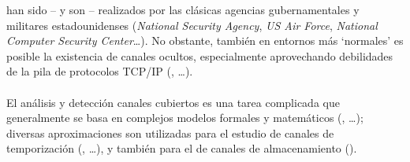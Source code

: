 han sido -- y son -- realizados por las cl\'asicas agencias gubernamentales 
y militares estadounidenses ({\it National Security Agency}, {\it US Air Force},
{\it National Computer Security Center}\ldots). No obstante, tambi\'en en
entornos m\'as `normales' es posible la existencia de canales ocultos, 
especialmente aprovechando debilidades de la pila de protocolos TCP/IP 
(\cite{kn:dae96}, \cite{kn:row96}\ldots).\\
\\El an\'alisis y detecci\'on canales cubiertos es una tarea complicada que
generalmente se basa en complejos modelos formales y matem\'aticos 
(\cite{kn:wra91a}, \cite{kn:mos94}\ldots); diversas aproximaciones son 
utilizadas para el estudio de 
canales de temporizaci\'on (\cite{kn:hu91}, \cite{kn:wra91b}\ldots), y tambi\'en
para el de canales de almacenamiento (\cite{kn:por91}).

